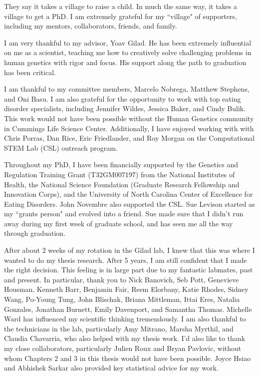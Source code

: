 \acknowledgments

They say it takes a village to raise a child. In much the same way, it takes a village to get a PhD. I am extremely grateful for my ``village" of supporters, including my mentors, collaborators, friends, and family.

I am very thankful to my advisor, Yoav Gilad. He has been extremely influential on me as a scientist, teaching me how to creatively solve challenging problems in human genetics with rigor and focus. His support along the path to graduation has been critical. 

I am thankful to my committee members, Marcelo Nobrega, Matthew Stephens, and Oni Basu. I am also grateful for the opportunity to work with top eating disorder specialists, including Jennifer Wildes, Jessica Baker, and Cindy Bulik. This work would not have been possible without the Human Genetics
community in Cummings Life Science Center. Additionally, I have enjoyed working with with Chris Porras, Dan Rice, Eric Friedlander, and Roy Morgan on the Computational STEM Lab (CSL) outreach program. 

Throughout my PhD, I have been financially supported by the Genetics and Regulation Training Grant (T32GM007197) from the National Institutes
of Health, the National Science Foundation (Graduate Research Fellowship and Innovation Corps), and the University of North Carolina Center of Excellence for Eating Disorders. John Novembre also supported the CSL. Sue Levison started as my ``grants person" and evolved into a friend. Sue made sure that I didn't run away during my first week of graduate school, and has seen me all the way through graduation.   

After about 2 weeks of my rotation in the Gilad lab, I knew that this was where I wanted to do my thesis research. After 5 years, I am still confident that I made the right decision. This feeling is in large part due to my fantastic labmates, past and present. In particular, thank you to Nick Banovich, Seb Pott, Genevieve Housman, Kenneth Barr, Benjamin Fair, Reem Elorbany, Katie Rhodes, Sidney Wang, Po-Young Tung, John Blischak, Briana Mittleman, Ittai Eres, Natalia Gonzales, Jonathan Burnett, Emily Davenport, and Samantha Thomas. Michelle Ward has influenced my scientific thinking tremendously. I am also thankful to the technicians in the lab, particularly Amy Mitrano,
Marsha Myrthil, and Claudia Chavarria, who also helped with my thesis work. I'd also like to thank my close collaborators, particularly Julien Roux and Bryan Pavlovic, without whom Chapters 2 and 3 in this thesis would not have been possible. Joyce Hsiao and Abhishek Sarkar also provided key statistical advice for my work. 

